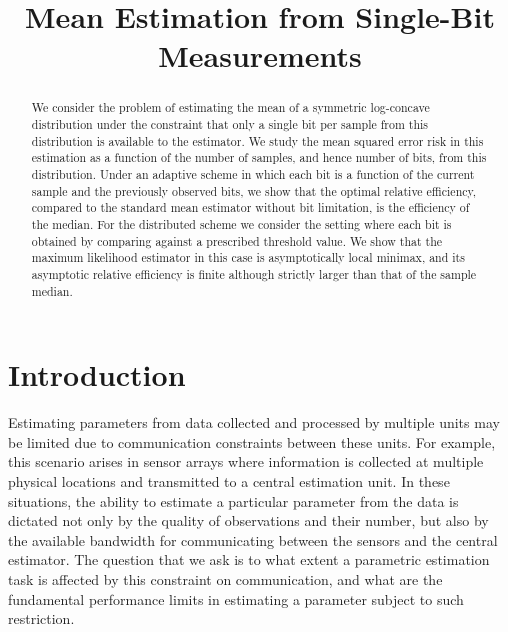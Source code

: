 \documentclass[letterpaper, conference, 11pt]{IEEEtran}      %
\title{\LARGE \bf Mean Estimation from Single-Bit Measurements}
\begin{document}
\graphicspath{{../Figs/}}
\maketitle
\thispagestyle{empty}
\pagestyle{empty}



\begin{abstract}
We consider the problem of estimating the mean of a symmetric log-concave distribution under the constraint that only a single bit per sample from this distribution is available to the estimator. We study the mean squared error risk in this estimation as a function of the number of samples, and hence number of bits, from this distribution. Under an adaptive scheme in which each bit is a function of the current sample and the previously observed bits, we show that the optimal relative efficiency, compared to the standard mean estimator without bit limitation, is the efficiency of the median. For the distributed scheme we consider the setting where each bit is obtained by comparing against a prescribed threshold value. We show that the maximum likelihood estimator in this case is asymptotically local minimax, and its asymptotic relative efficiency is finite although strictly larger than that of the sample median. 
%
\end{abstract}



\section{Introduction}
\label{sec:Intro}
Estimating parameters from data collected and processed by multiple units may be limited due to communication constraints between these units. 
%
For example, this scenario arises in sensor arrays where information is collected at multiple physical locations and transmitted to a central estimation unit. In these situations, the ability to estimate a particular parameter from the data is dictated not only by the quality of observations and their number, but also by the available bandwidth for communicating between the sensors and the central estimator. The question that we ask is to what extent a parametric estimation task is affected by this constraint on communication, and what are the fundamental performance limits in estimating a parameter subject to such restriction. \\
\end{document}
